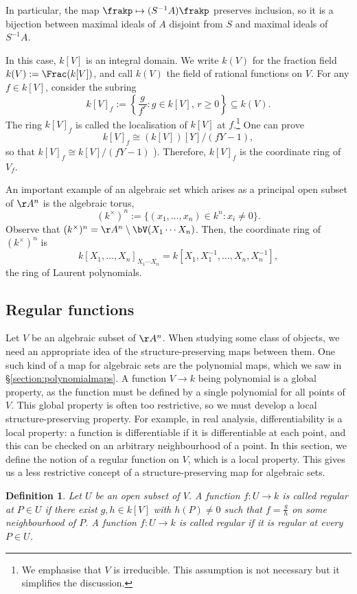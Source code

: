 \documentclass[12pt]{amsart}
\theoremstyle{plain}
\newtheorem{definition}[theorem]{Definition}
\begin{document}
In particular, the map $\frakp \mapsto (S^{-1}A) \frakp$ preserves inclusion, so it is a bijection between maximal ideals of $A$ disjoint from $S$ and maximal ideals of $S^{-1}A$.

In this case, $k[V]$ is an integral domain.
We write $k(V)$ for the fraction field $k(V):=\Frac(k[V])$, and call $k(V)$ the field of rational functions on $V$.
For any $f \in k[V]$, consider the subring
$$k[V]_f := \left\{\frac{g}{f^r} : g \in k[V], \, r \ge 0\right\} \subseteq k(V).$$
The ring $k[V]_f$ is called the localisation of $k[V]$ at $f$.\footnote{We emphasise that $V$ is irreducible. This assumption is not necessary but it simplifies the discussion.}
One can prove 
$$k[V]_f \cong (k[V])[Y] / (f Y -1),$$
so that $k[V]_f \cong k[V]/(fY-1)$ \cite[Lemma 1.13]{Milne13}).
Therefore, $k[V]_f$ is the coordinate ring of $V_f$.

An important example of an algebraic set which arises as a principal open subset of $\AA^n$ is the algebraic torus,
$$(k^\times)^n := \{(x_1, \ldots, x_n) \in k^n : x_i \ne 0\}.$$
Observe that $(k^\times)^n = \AA^n \setminus \bV(X_1 \cdots X_n)$.
Then, the coordinate ring of $(k^\times)^n$ is 
$$k[X_1, \ldots, X_n]_{X_1 \cdots X_n} = k[X_1, X_1^{-1}, \ldots, X_n, X_n^{-1}],$$
the ring of Laurent polynomials.





\subsection{Regular functions}
Let $V$ be an algebraic subset of $\AA^n$.
When studying some class of objects, we need an appropriate idea of the structure-preserving maps between them.
One such kind of a map for algebraic sets are the polynomial maps, which we saw in \S \ref{section:polynomialmaps}.
A function $V \to k$ being polynomial is a global property, as the function must be defined by a single polynomial for all points of $V$.
This global property is often too restrictive, so we must develop a local structure-preserving property.
For example, in real analysis, differentiability is a local property: a function is differentiable if it is differentiable at each point, and this can be checked on an arbitrary neighbourhood of a point.
In this section, we define the notion of a regular function on $V$, which is a local property.
This gives us a less restrictive concept of a structure-preserving map for algebraic sets.

\begin{definition}
Let $U$ be an open subset of $V$.
A function $f : U \to k$ is called regular at $P \in U$ if there exist $g, h \in k[V]$ with $h(P)\ne 0$ such that $f = \frac{g}{h}$ on some neighbourhood of $P$.
A function $f:U\to k$ is called regular if it is regular at every $P \in U$.
\end{definition}
\end{document}
